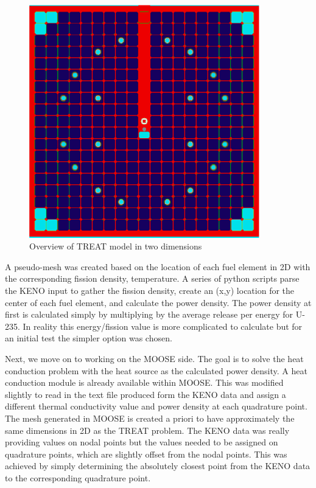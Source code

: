 \documentclass[11pt]{article}
\begin{document}
\begin{figure}
    \centering
    \includegraphics[width=10cm]{figures/treat_top_view.png}
    \caption{Overview of TREAT model in two dimensions}
    \label{fig:treat2d}
\end{figure}

A pseudo-mesh was created based on the location of each fuel element in 2D with the corresponding fission density, temperature.  A series of python scripts parse the KENO input to gather the fission density, create an (x,y) location for the center of each fuel element, and calculate the power density.  The power density at first is calculated simply by multiplying by the average release per energy for U-235.  In reality this energy/fission value is more complicated to calculate but for an initial test the simpler option was chosen.  

	Next, we move on to working on the MOOSE side.  The goal is to solve the heat conduction problem with the heat source as the calculated power density. A heat conduction module is already available within MOOSE.  This was modified slightly to read in the text file produced form the KENO data and assign a different thermal conductivity value and power density at each quadrature point.  The mesh generated in MOOSE is created a priori  to have approximately the same dimensions in 2D as the TREAT problem.  The KENO data was really providing values on nodal points but the values needed to be assigned on quadrature points, which are slightly offset from the nodal points.  This was achieved by simply determining the absolutely closest point from the KENO data to the corresponding quadrature point. 
	
\end{document}
